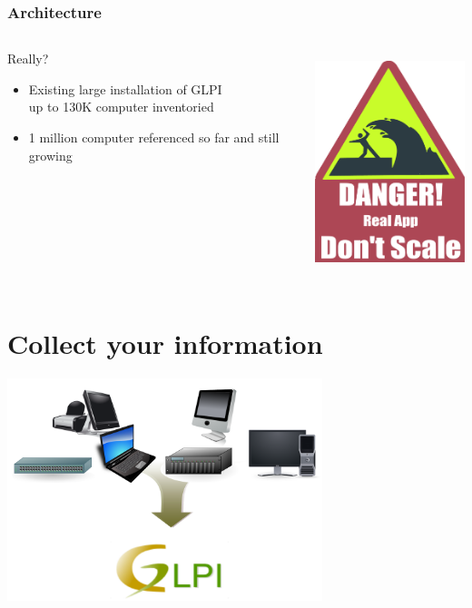 \documentclass{beamer}
\begin{document}
\begin{frame}
    \frametitle{Architecture}

 \begin{columns}
 \begin{column}{0.34\textwidth}
    \begin{block}{Really?}
        \begin{itemize}
            \item Existing large installation of GLPI \\
            {\small up to 130K computer inventoried}
            \item 1 million computer referenced so far and still growing
        \end{itemize}
    \end{block}

 \end{column}
 \begin{column}{0.90\textwidth}
    \includegraphics[height=6.5cm]{pics/scale.pdf}

 \end{column}
\end{columns}

\end{frame}


\section{Collect your information}

\begin{frame}
\includegraphics[height=6.5cm]{pics/bigpicture.pdf}
\end{frame}
\end{document}
